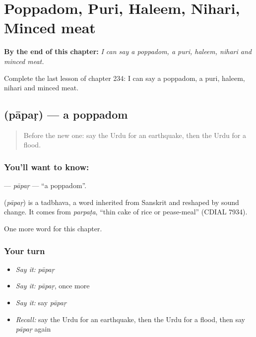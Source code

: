 
\chapter{Poppadom, Puri, Haleem, Nihari, Minced meat}
\label{ch:ur-poppadom-puri-haleem-nihari-minced-meat}

\begin{chapteropening}
\textbf{By the end of this chapter:} \emph{I can say a poppadom, a puri, haleem, nihari and minced meat.}

Complete the last lesson of chapter 234: I can say a poppadom, a puri, haleem, nihari and minced meat.
\end{chapteropening}

\section[\texorpdfstring{\ur{پاپڑ} (pāpaṛ)}{پاپڑ (pāpaṛ)}]{ (pāpaṛ) — a poppadom}

\label{lesson:UR-C234-papar}



\begin{quote}
Before the new one: say the Urdu for an earthquake, then the Urdu for a flood.
\end{quote}

\subsection*{You'll want to know: }
\textbf{} — \emph{pāpaṛ} — \textquotedblleft{}a poppadom\textquotedblright{}.

\begin{cousinweb}
\textbf{} (\emph{pāpaṛ}) is a tadbhava, a word inherited from Sanskrit and reshaped by sound change. It comes from \emph{parpaṭa}, \textquotedblleft{}thin cake of rice or pease-meal\textquotedblright{} (CDIAL 7934).
\end{cousinweb}

\begin{grammarlens}[title={What you've built}]
One more word for this chapter.
\end{grammarlens}

\subsection*{Your turn}
\begin{itemize}
\raggedright
  \item \emph{Say it:} \emph{pāpaṛ}
  \item \emph{Say it:} \emph{pāpaṛ}, once more
  \item \emph{Say it:} say \emph{pāpaṛ}
  \item \emph{Recall:} say the Urdu for an earthquake, then the Urdu for a flood, then say \emph{pāpaṛ} again
\end{itemize}

